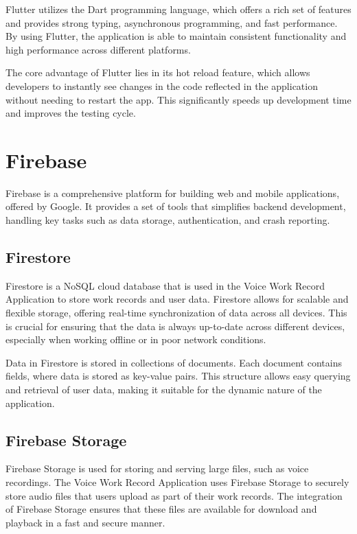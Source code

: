 \documentclass[
  digital,     %
  oneside,     %
  nosansbold,  %
  nocolorbold, %
  lof,         %
  lot,         %
]{fithesis4}
\begin{document}
Flutter utilizes the Dart programming language, which offers a rich set of features and provides strong typing, asynchronous programming, and fast performance. By using Flutter, the application is able to maintain consistent functionality and high performance across different platforms.

The core advantage of Flutter lies in its hot reload feature, which allows developers to instantly see changes in the code reflected in the application without needing to restart the app. This significantly speeds up development time and improves the testing cycle.

\section{Firebase}

Firebase is a comprehensive platform for building web and mobile applications, offered by Google. It provides a set of tools that simplifies backend development, handling key tasks such as data storage, authentication, and crash reporting.

\subsection{Firestore}

Firestore is a NoSQL cloud database that is used in the Voice Work Record Application to store work records and user data. Firestore allows for scalable and flexible storage, offering real-time synchronization of data across all devices. This is crucial for ensuring that the data is always up-to-date across different devices, especially when working offline or in poor network conditions.

Data in Firestore is stored in collections of documents. Each document contains fields, where data is stored as key-value pairs. This structure allows easy querying and retrieval of user data, making it suitable for the dynamic nature of the application.

\subsection{Firebase Storage}

Firebase Storage is used for storing and serving large files, such as voice recordings. The Voice Work Record Application uses Firebase Storage to securely store audio files that users upload as part of their work records. The integration of Firebase Storage ensures that these files are available for download and playback in a fast and secure manner.
\end{document}

